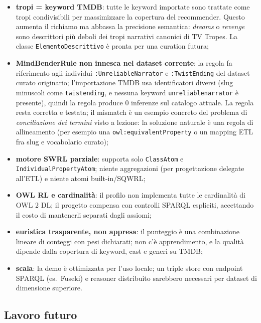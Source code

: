 \documentclass[a4paper,11pt]{article}
\newcommand{\code}[1]{\texttt{#1}}
\begin{document}
\begin{itemize}
  \item \textbf{tropi = keyword TMDB}: tutte le keyword importate sono
        trattate come tropi condivisibili per massimizzare la copertura del
        recommender. Questo aumenta il richiamo ma abbassa la precisione
        semantica: \emph{dreams} o \emph{revenge} sono descrittori pi\`u
        deboli dei tropi narrativi canonici di TV Tropes. La classe
        \code{ElementoDescrittivo} \`e pronta per una curation futura;
  \item \textbf{MindBenderRule non innesca nel dataset corrente}: la regola
        fa riferimento agli individui \code{:UnreliableNarrator} e
        \code{:TwistEnding} del dataset curato originario; l'importazione
        TMDB usa identificatori diversi (slug minuscoli come
        \code{twistending}, e nessuna keyword \code{unreliablenarrator}
        \`e presente), quindi la regola produce 0 inferenze sul catalogo
        attuale. La regola resta corretta e testata; il mismatch \`e un
        esempio concreto del problema di \emph{conciliazione dei termini}
        visto a lezione: la soluzione naturale \`e una regola di
        allineamento (per esempio una \code{owl:equivalentProperty} o un
        mapping ETL fra slug e vocabolario curato);
  \item \textbf{motore SWRL parziale}: supporta solo \code{ClassAtom} e
        \code{IndividualPropertyAtom}; niente aggregazioni (per progettazione
        delegate all'ETL) e niente atomi built-in/SQWRL;
  \item \textbf{OWL RL e cardinalit\`a}: il profilo non implementa tutte
        le cardinalit\`a di OWL 2 DL; il progetto compensa con controlli
        SPARQL espliciti, accettando il costo di mantenerli separati dagli
        assiomi;
  \item \textbf{euristica trasparente, non appresa}: il punteggio \`e una
        combinazione lineare di conteggi con pesi dichiarati; non c'\`e
        apprendimento, e la qualit\`a dipende dalla copertura di keyword,
        cast e generi su TMDB;
  \item \textbf{scala}: la demo \`e ottimizzata per l'uso locale; un
        triple store con endpoint SPARQL (es.\ Fuseki) e reasoner
        distribuito sarebbero necessari per dataset di dimensione
        superiore.
\end{itemize}

\subsection{Lavoro futuro}
\end{document}
